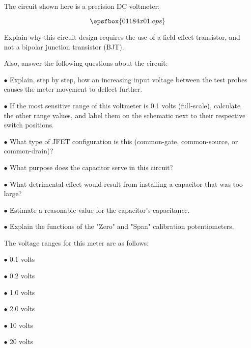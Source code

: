 

The circuit shown here is a precision DC voltmeter:

$$\epsfbox{01184x01.eps}$$

Explain why this circuit design requires the use of a field-effect transistor, and not a bipolar junction transistor (BJT).

\vskip 10pt

Also, answer the following questions about the circuit:

\medskip
\item{$\bullet$} Explain, step by step, how an increasing input voltage between the test probes causes the meter movement to deflect further.
\item{$\bullet$} If the most sensitive range of this voltmeter is 0.1 volts (full-scale), calculate the other range values, and label them on the schematic next to their respective switch positions.
\item{$\bullet$} What type of JFET configuration is this (common-gate, common-source, or common-drain)?
\item{$\bullet$} What purpose does the capacitor serve in this circuit?
\item{$\bullet$} What detrimental effect would result from installing a capacitor that was too large? 
\item{$\bullet$} Estimate a reasonable value for the capacitor's capacitance.
\item{$\bullet$} Explain the functions of the "Zero" and "Span" calibration potentiometers.
\medskip







The voltage ranges for this meter are as follows:

\medskip
\item{$\bullet$} 0.1 volts
\item{$\bullet$} 0.2 volts
\item{$\bullet$} 1.0 volts
\item{$\bullet$} 2.0 volts
\item{$\bullet$} 10 volts
\item{$\bullet$} 20 volts
\medskip

